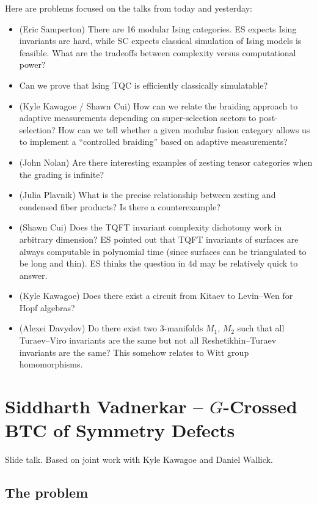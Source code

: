 \documentclass{amsart}
\begin{document}
Here are problems focused on the talks from today and yesterday:
\begin{itemize}
  \item (Eric Samperton) There are 16 modular Ising categories.
    ES expects Ising invariants are hard, while SC expects classical simulation of Ising models is feasible.
    What are the tradeoffs between complexity versus computational power?
  \item Can we prove that Ising TQC is efficiently classically simulatable?
  \item (Kyle Kawagoe / Shawn Cui) How can we relate the braiding approach to adaptive measurements depending on super-selection sectors to post-selection?
    How can we tell whether a given modular fusion category allows us to implement a ``controlled braiding'' based on adaptive measurements?
  \item (John Nolan) Are there interesting examples of zesting tensor categories when the grading is infinite?
  \item (Julia Plavnik) What is the precise relationship between zesting and condensed fiber products?
    Is there a counterexample?
  \item (Shawn Cui) Does the TQFT invariant complexity dichotomy work in arbitrary dimension?
    ES pointed out that TQFT invariants of surfaces are always computable in polynomial time (since surfaces can be triangulated to be long and thin).
    ES thinks the question in $4$d may be relatively quick to answer.
  \item (Kyle Kawagoe) Does there exist a circuit from Kitaev to Levin--Wen for Hopf algebras?
  \item (Alexei Davydov) Do there exist two $3$-manifolds $M_1$, $M_2$ such that all Turaev--Viro invariants are the same but not all Reshetikhin--Turaev invariants are the same?
    This somehow relates to Witt group homomorphisms.
\end{itemize}

\section{Siddharth Vadnerkar -- $G$-Crossed BTC of Symmetry Defects}

Slide talk.
Based on joint work with Kyle Kawagoe and Daniel Wallick.

\subsection{The problem}
\end{document}
